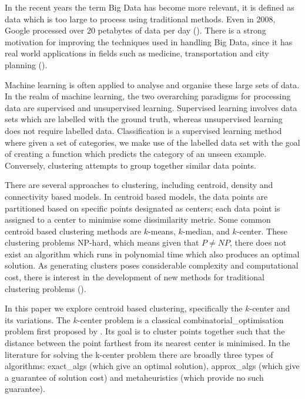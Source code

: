 In the recent years the term Big Data has become more relevant, it is defined as data which is too large to process using traditional methods. Even in 2008, Google processed over 20 petabytes of data per day (\cite{dean_mapreduce_2008}). There is a strong motivation for improving the techniques used in handling Big Data, since it has real world applications in fields such as medicine, transportation and city planning (\cite{al_nuaimi_applications_2015,obermeyer_predicting_2016}). 

Machine learning is often applied to analyse and organise these large sets of data. In the realm of machine learning, the two overarching paradigms for processing data are supervised and unsupervised learning. Supervised learning involves data sets which are labelled with the ground truth, whereas unsupervised learning does not require labelled data. Classification is a supervised learning method where given a set of categories, we make use of the labelled data set with the goal of creating a function which predicts the category of an unseen example. Conversely, clustering attempts to group together similar data points. 

There are several approaches to clustering, including centroid, density and connectivity based models. In centroid based models, the data points are partitioned based on specific points designated as centers; each data point is assigned to a center to minimise some dissimilarity metric. Some common centroid based clustering methods are $k$-means, $k$-median, and $k$-center. These clustering problems NP-hard, which means given that $P\neq NP$, there does not exist an algorithm which runs in polynomial time which also produces an optimal solution. As generating clusters poses considerable complexity and computational cost, there is interest in the development of new methods for traditional clustering problems (\cite{zhao_parallel_1970}). 

In this paper we explore centroid based clustering, specifically the $k$-center and its variations. The $k$-center problem is a classical \gls{combinatorial_optimisation} problem first proposed by \textcite{hakimi_optimum_1964}. Its goal is to cluster points together such that the distance between the point farthest from its nearest center is minimised. In the literature for solving the k-center problem there are broadly three types of algorithms: \gls{exact_algs} (which give an optimal solution), \gls{approx_algs} (which give a guarantee of solution cost) and \glspl{metaheuristic} (which provide no such guarantee).

